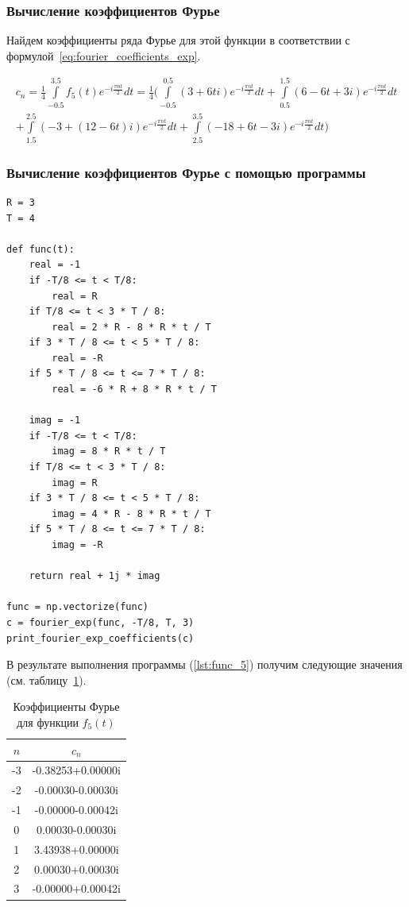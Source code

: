\subsubsection{Вычисление коэффициентов Фурье}
Найдем коэффициенты ряда Фурье для этой функции в соответствии с формулой~\ref{eq:fourier_coefficients_exp}.

\begin{multline}
    c_n = \frac{1}{4}\int\limits_{-0.5}^{3.5} f_5(t) e^{-i \frac{\pi nt}{2}} dt = \frac{1}{4} ( \int\limits_{-0.5}^{0.5} (3 + 6ti)e^{-i \frac{\pi nt}{2}} dt + \int\limits_{0.5}^{1.5} (6 - 6t + 3i)e^{-i \frac{\pi nt}{2}} dt \\
    + \int\limits_{1.5}^{2.5}(-3 + (12 - 6t)i) e^{-i \frac{\pi nt}{2}} dt + \int\limits_{2.5}^{3.5}(-18 + 6t - 3i) e^{-i \frac{\pi nt}{2}} dt )
\end{multline}

\subsubsection{Вычисление коэффициентов Фурье с помощью программы}

\begin{lstlisting}[style=python_white, caption=Вычисление коэффициентов Фурье, label=lst:func_5]
R = 3
T = 4

def func(t):
    real = -1
    if -T/8 <= t < T/8:
        real = R
    if T/8 <= t < 3 * T / 8:
        real = 2 * R - 8 * R * t / T 
    if 3 * T / 8 <= t < 5 * T / 8:
        real = -R
    if 5 * T / 8 <= t <= 7 * T / 8:
        real = -6 * R + 8 * R * t / T

    imag = -1
    if -T/8 <= t < T/8:
        imag = 8 * R * t / T
    if T/8 <= t < 3 * T / 8:
        imag = R
    if 3 * T / 8 <= t < 5 * T / 8:
        imag = 4 * R - 8 * R * t / T
    if 5 * T / 8 <= t <= 7 * T / 8:
        imag = -R

    return real + 1j * imag

func = np.vectorize(func)
c = fourier_exp(func, -T/8, T, 3)
print_fourier_exp_coefficients(c)
\end{lstlisting}

В результате выполнения программы (\ref{lst:func_5}) получим следующие значения (см. таблицу~\ref{tab:func_5_exp}).

\begin{table}[h!]
    \centering
    \begin{tabular}{|c|c|}
        \hline
        $n$ & $c_n$ \\
        \hline
        -3 & -0.38253+0.00000i \\
        -2 & -0.00030-0.00030i \\
        -1 & -0.00000-0.00042i \\
        0 & 0.00030-0.00030i \\
        1 & 3.43938+0.00000i \\
        2 & 0.00030+0.00030i \\
        3 & -0.00000+0.00042i \\
        \hline
    \end{tabular}
    \caption{Коэффициенты Фурье для функции $f_5(t)$ }
    \label{tab:func_5_exp}
\end{table}

